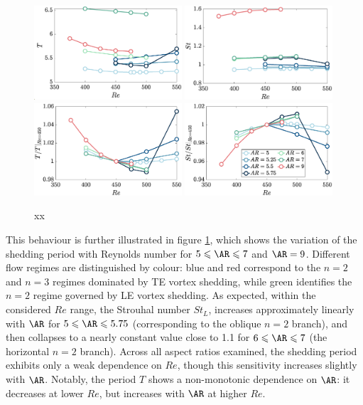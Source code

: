 \begin{figure}
  \centering
  \includegraphics[width=0.49\textwidth]{./fig/long/T_Re.eps}
  \includegraphics[width=0.49\textwidth]{./fig/long/St_Re.eps}
  \includegraphics[width=0.49\textwidth]{./fig/long/T_Re_b.eps}
  \includegraphics[width=0.49\textwidth]{./fig/long/St_Re_b.eps}
  \caption{xx}
  \label{fig:T_St_Re_long}
\end{figure}

This behaviour is further illustrated in figure \ref{fig:T_St_Re_long}, which shows the variation of the shedding period with Reynolds number for $5 \le \AR \le 7$ and $\AR = 9$. Different flow regimes are distinguished by colour: blue and red correspond to the $n = 2$ and $n = 3$ regimes dominated by TE vortex shedding, while green identifies the $n = 2$ regime governed by LE vortex shedding. As expected, within the considered $Re$ range, the Strouhal number $St_L$, increases approximately linearly with $\AR$ for $5 \le \AR \le 5.75$ (corresponding to the oblique $n = 2$ branch), and then collapses to a nearly constant value close to 1.1 for $6 \le \AR \le 7$ (the horizontal $n = 2$ branch).
%
Across all aspect ratios examined, the shedding period exhibits only a weak dependence on $Re$, though this sensitivity increases slightly with $\AR$. Notably, the period $T$ shows a non-monotonic dependence on $\AR$: it decreases at lower $Re$, but increases with $\AR$ at higher $Re$.


